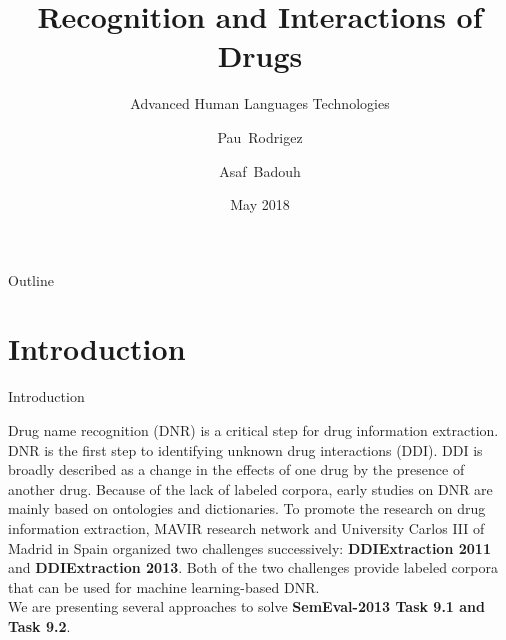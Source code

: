 \documentclass[xcolor=table]{beamer}
\title{Recognition and Interactions of Drugs}
\subtitle{Advanced Human Languages Technologies}
\author{Pau~Rodrigez \and Asaf~Badouh}
\institute[]
{
  Universitat Politècnica de Catalunya\\
  }
\date{May 2018}
\begin{document}
\begin{frame}
  \titlepage
\end{frame}

\begin{frame}{Outline}
  \tableofcontents
\end{frame}


\section{Introduction}
\begin{frame}{Introduction}

Drug name recognition (DNR) is a critical step for drug information extraction.
DNR is the first step to identifying unknown drug interactions (DDI).
DDI is broadly described as a change in the effects of one drug by the presence of another drug.
Because of the lack of labeled corpora, early studies on DNR are mainly based on ontologies and dictionaries.
To promote the research on drug information extraction, MAVIR research network and University Carlos III of Madrid in Spain organized two challenges successively: \textbf{DDIExtraction 2011} and \textbf{DDIExtraction 2013}. 
Both of the two challenges provide labeled corpora that can be used for machine learning-based DNR.\\
We are presenting several approaches to solve \textbf{SemEval-2013 Task 9.1 and Task 9.2}. 
\end{frame}



    
\end{document}
